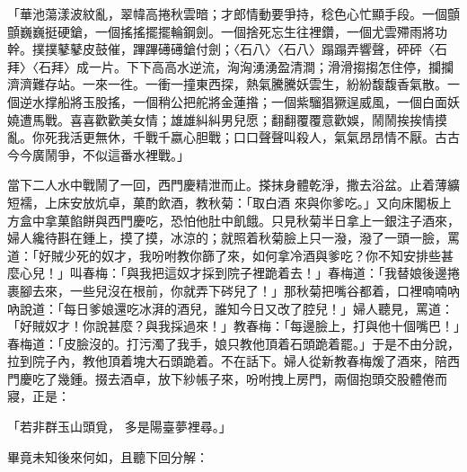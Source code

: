 \begin{showcontents}{}
「華池蕩漾波紋亂，翠幃高捲秋雲暗；才郎情動要爭持，稔色心忙顯手段。一個顫顫巍巍挺硬鎗，一個搖搖擺擺輪鋼劍。一個捨死忘生往裡鑽，一個尤雲殢雨將功幹。撲撲鼕鼕皮鼓催，蹕蹕礡礡鎗付劍；〈石八〉〈石八〉蹋蹋弄響聲，砰砰〈石拜〉〈石拜〉成一片。下下高高水逆流，洶洶湧湧盈清澗；滑滑搊搊怎住停，攔攔濟濟難存站。一來一徃。一衝一撞東西探，熱氣騰騰妖雲生，紛紛馥馥香氣散。一個逆水撑船將玉股搖，一個稍公把舵將金蓮揝；一個紫騮猖獗逞威風，一個白面妖嬈遭馬戰。喜喜歡歡美女情；雄雄糾糾男兒愿；翻翻覆覆意歡娛，鬧鬧挨挨情摸亂。你死我活更無休，千戰千嬴心胆戰；口口聲聲叫殺人，氣氣昂昂情不厭。古古今今廣鬧爭，不似這番水裡戰。」

當下二人水中戰鬧了一回，西門慶精泄而止。搽抹身體乾淨，撒去浴盆。止着薄纊短襦，上床安放炕卓，菓酌飲酒，教秋菊：「取白酒 來與你爹吃。」又向床閣板上方盒中拿菓餡餅與西門慶吃，恐怕他肚中飢餓。只見秋菊半日拿上一銀注子酒來，婦人纔待斟在鍾上，摸了摸，冰涼的；就照着秋菊臉上只一潑，潑了一頭一臉，罵道：「好賊少死的奴才，我吩咐教你篩了來，如何拿冷酒與爹吃？你不知安排些甚麼心兒！」叫春梅：「與我把這奴才採到院子裡跪着去！」春梅道：「我替娘後邊捲裹腳去來，一些兒沒在根前，你就弄下硶兒了！」那秋菊把嘴谷都着，口裡喃喃吶吶說道：「每日爹娘還吃冰湃的酒兒，誰知今日又改了腔兒！」婦人聽見，罵道：「好賊奴才！你說甚麼？與我採過來！」教春梅：「每邊臉上，打與他十個嘴巴！」春梅道：「皮臉沒的。打污濁了我手，娘只教他頂着石頭跪着罷。」于是不由分說，拉到院子內，教他頂着塊大石頭跪着。不在話下。婦人從新教春梅煖了酒來，陪西門慶吃了幾鍾。掇去酒卓，放下紗帳子來，吩咐拽上房門，兩個抱頭交股體倦而寢，正是：

「若非群玉山頭覓，  多是陽臺夢裡尋。」

畢竟未知後來何如，且聽下回分解：





\end{showcontents}


